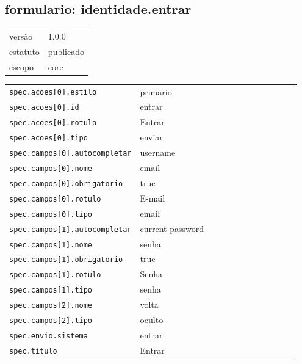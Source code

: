 \subsection*{formulario: identidade.entrar}
\begin{tabular}{@{}ll@{}}
versão & 1.0.0 \\
estatuto & publicado \\
escopo & core \\
\end{tabular}

\begin{tabular}{@{}p{0.35\linewidth}p{0.6\linewidth}@{}}
\texttt{spec.acoes[0].estilo} & primario \\
\texttt{spec.acoes[0].id} & entrar \\
\texttt{spec.acoes[0].rotulo} & Entrar \\
\texttt{spec.acoes[0].tipo} & enviar \\
\texttt{spec.campos[0].autocompletar} & username \\
\texttt{spec.campos[0].nome} & email \\
\texttt{spec.campos[0].obrigatorio} & true \\
\texttt{spec.campos[0].rotulo} & E-mail \\
\texttt{spec.campos[0].tipo} & email \\
\texttt{spec.campos[1].autocompletar} & current-password \\
\texttt{spec.campos[1].nome} & senha \\
\texttt{spec.campos[1].obrigatorio} & true \\
\texttt{spec.campos[1].rotulo} & Senha \\
\texttt{spec.campos[1].tipo} & senha \\
\texttt{spec.campos[2].nome} & volta \\
\texttt{spec.campos[2].tipo} & oculto \\
\texttt{spec.envio.sistema} & entrar \\
\texttt{spec.titulo} & Entrar \\
\end{tabular}
